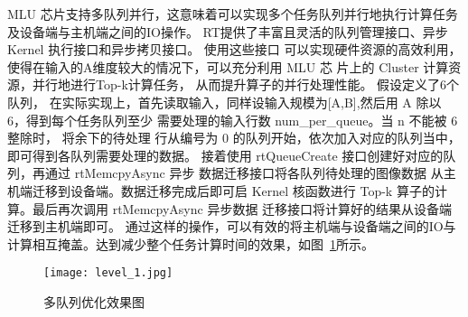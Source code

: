 MLU 芯片支持多队列并行，这意味着可以实现多个任务队列并行地执行计算任务及设备端与主机端之间的IO操作。
RT提供了丰富且灵活的队列管理接口、异步 Kernel 执行接口和异步拷贝接口。 使用这些接口
 可以实现硬件资源的高效利用，使得在输入的A维度较大的情况下，可以充分利用 MLU 芯
 片上的 Cluster 计算资源，并行地进行Top-k计算任务， 从而提升算子的并行处理性能。
 假设定义了6个队列，
在实际实现上，首先读取输入，同样设输入规模为[A,B],然后用 A 除以 6，得到每个任务队列至少
  需要处理的输入行数 num\_per\_queue。当 n 不能被 6 整除时， 将余下的待处理
  行从编号为 0 的队列开始，依次加入对应的队列当中，即可得到各队列需要处理的数据。
  接着使用 rtQueueCreate 接口创建好对应的队列，再通过 rtMemcpyAsync 异步
  数据迁移接口将各队列待处理的图像数据 从主机端迁移到设备端。数据迁移完成后即可启
   Kernel 核函数进行 Top-k 算子的计算。最后再次调用 rtMemcpyAsync 异步数据
   迁移接口将计算好的结果从设备端迁移到主机端即可。
通过这样的操作，可以有效的将主机端与设备端之间的IO与计算相互掩盖。达到减少整个任务计算时间的效果，如图~\ref{fig:level}所示。
\begin{figure}[ht]
    \centering
    \texttt{[image: level\_1.jpg]}
    \caption{多队列优化效果图}
    \label{fig:level}
\end{figure}










